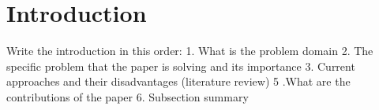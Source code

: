 \section{Introduction}
\label{sec:introduction}

Write the introduction in this order:
1. What is the problem domain
2. The specific problem that the paper is solving and its importance
3. Current approaches and their disadvantages  (literature review)
5 .What are the contributions of the paper
6. Subsection summary
~\cite{stolarska2001}
